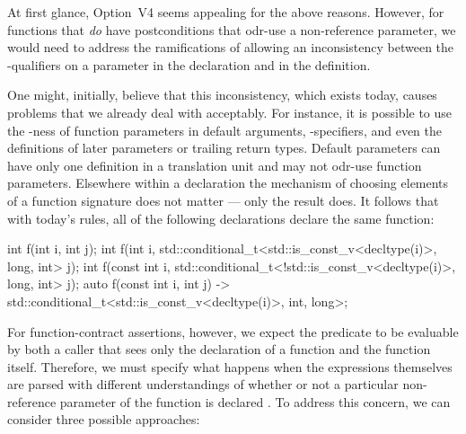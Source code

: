 At first glance, Option~V4 seems appealing for the above reasons. However, for functions that \emph{do} have postconditions that odr-use a non-reference parameter, we would need to address the ramifications of allowing an inconsistency between the -qualifiers on a parameter in the declaration and in the definition.

One might, initially, believe that this inconsistency, which exists today, causes problems that we already deal with acceptably.  For instance, it is possible to use the -ness of function parameters in default arguments, -specifiers, and even the definitions of later parameters or trailing return types.   Default parameters can have only one definition in a translation unit and may not odr-use function parameters.  Elsewhere within a declaration the mechanism of choosing elements of a function signature does not matter --- only the result does. It follows that with today's rules, all of the following declarations declare the same function:
\begin{codeblock}
int f(int i, int j);
int f(int i, std::conditional_t<std::is_const_v<decltype(i)>, long, int> j);
int f(const int i, std::conditional_t<!std::is_const_v<decltype(i)>, long, int> j);
auto f(const int i, int j)
-> std::conditional_t<std::is_const_v<decltype(i)>, int, long>;
\end{codeblock}
For function-contract assertions, however, we expect the predicate to be evaluable by both a caller that sees only the declaration of a function and the function itself.  Therefore, we must specify what happens when the expressions themselves are parsed with different understandings of whether or not a particular non-reference parameter of the function is declared .  To address this concern, we can consider three possible approaches:
\renewcommand\labelenumi{V4\alph{enumi}.}
\renewcommand\theenumi\labelenumi
